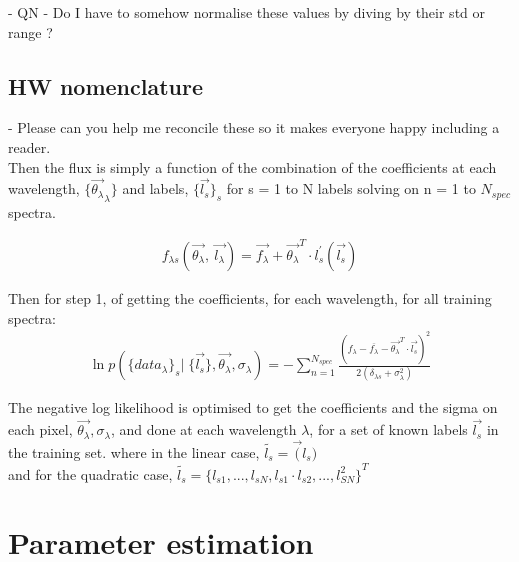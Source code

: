 \documentclass[12pt, preprint]{aastex}
\newcommand{\mean}[1]{\overline{#1}}
\begin{document}
- QN  - Do I have to somehow normalise these values by diving by their std or range ? 

\subsection{HW nomenclature}

- Please can you help me reconcile these so it makes everyone happy including a reader. \\


Then the flux is simply a function of the combination of the coefficients at each wavelength, $\{ \vec{\theta_\lambda}_\lambda \}$ and labels, $\{ \vec{l_{s}} \}_s$ for s = 1 to N labels solving on n = 1 to $N_{spec}$ spectra. 

 \begin{eqnarray}
f_{\lambda s}(\vec{\theta_{\lambda}},  \: \vec{l_\lambda} ) = \vec{f_\lambda} + {\vec{\theta_\lambda}^T \cdot l_s^{'} ( \vec{l_s})}
\end{eqnarray}

Then for step 1, of getting the coefficients, for each wavelength, for all training spectra: \\

 \begin{eqnarray}
\ln p ( \{ data_\lambda \}_s | \; \{ \vec{l_s} \}, \vec{\theta_\lambda }, {\sigma_\lambda} )  = 
- \sum\limits_{n=1}^{N_{spec}}  \frac{(f_\lambda - \mean{f_\lambda} - \vec{\theta_\lambda }^T  \cdot \vec{l_s})^2} {2(\delta_{\lambda s} + \sigma_\lambda^{2})}
\end{eqnarray}

The negative log likelihood is optimised to get the coefficients and the sigma on each pixel, $\vec{\theta_\lambda}, \sigma_\lambda$, and done at each wavelength $\lambda$, for a set of known labels $\vec{l_s}$ in the training set. 
\noindent where in the linear case, $\tilde{l_s} = \vec(l_s)$ \\
and for the quadratic case,  $\tilde{l_s} = { \{l_{s1}, ... , l_{sN}, l_{s1} \cdot l_{s2} , ..., l_{SN}^2\}}^T $\\



\section{Parameter estimation}
\end{document}
